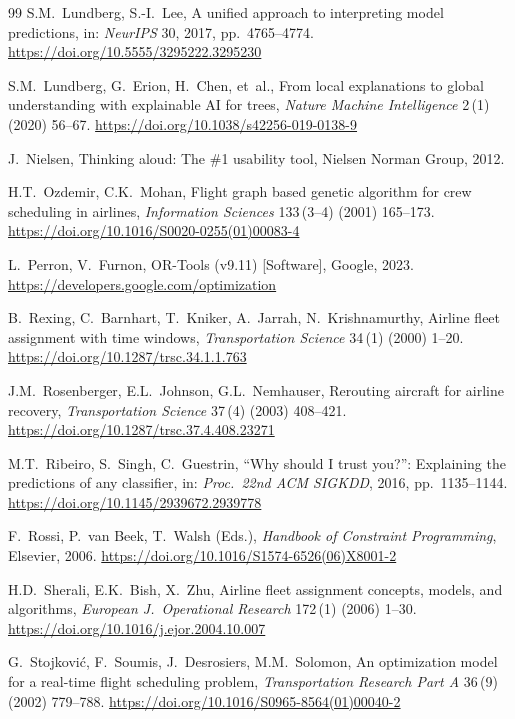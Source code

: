 \documentclass[12pt,number]{elsarticle}
\begin{document}
\begin{thebibliography}{99}
 S.M.~Lundberg, S.-I.~Lee, A unified approach to interpreting model predictions, in: \textit{NeurIPS} 30, 2017, pp.~4765--4774. \url{https://doi.org/10.5555/3295222.3295230}

 S.M.~Lundberg, G.~Erion, H.~Chen, et~al., From local explanations to global understanding with explainable AI for trees, \textit{Nature Machine Intelligence} 2\,(1) (2020) 56--67. \url{https://doi.org/10.1038/s42256-019-0138-9}

 J.~Nielsen, Thinking aloud: The \#1 usability tool, Nielsen Norman Group, 2012.

 H.T.~Ozdemir, C.K.~Mohan, Flight graph based genetic algorithm for crew scheduling in airlines, \textit{Information Sciences} 133\,(3--4) (2001) 165--173. \url{https://doi.org/10.1016/S0020-0255(01)00083-4}

 L.~Perron, V.~Furnon, OR-Tools (v9.11) [Software], Google, 2023. \url{https://developers.google.com/optimization}

 B.~Rexing, C.~Barnhart, T.~Kniker, A.~Jarrah, N.~Krishnamurthy, Airline fleet assignment with time windows, \textit{Transportation Science} 34\,(1) (2000) 1--20. \url{https://doi.org/10.1287/trsc.34.1.1.763}

 J.M.~Rosenberger, E.L.~Johnson, G.L.~Nemhauser, Rerouting aircraft for airline recovery, \textit{Transportation Science} 37\,(4) (2003) 408--421. \url{https://doi.org/10.1287/trsc.37.4.408.23271}

 M.T.~Ribeiro, S.~Singh, C.~Guestrin, ``Why should I trust you?'': Explaining the predictions of any classifier, in: \textit{Proc.\ 22nd ACM SIGKDD}, 2016, pp.~1135--1144. \url{https://doi.org/10.1145/2939672.2939778}

 F.~Rossi, P.~van Beek, T.~Walsh (Eds.), \textit{Handbook of Constraint Programming}, Elsevier, 2006. \url{https://doi.org/10.1016/S1574-6526(06)X8001-2}

 H.D.~Sherali, E.K.~Bish, X.~Zhu, Airline fleet assignment concepts, models, and algorithms, \textit{European J.\ Operational Research} 172\,(1) (2006) 1--30. \url{https://doi.org/10.1016/j.ejor.2004.10.007}

 G.~Stojkovi\'c, F.~Soumis, J.~Desrosiers, M.M.~Solomon, An optimization model for a real-time flight scheduling problem, \textit{Transportation Research Part A} 36\,(9) (2002) 779--788. \url{https://doi.org/10.1016/S0965-8564(01)00040-2}


\end{thebibliography}
\end{document}
